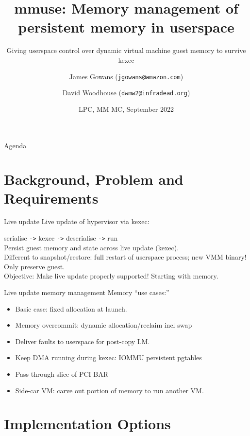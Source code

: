 \documentclass{beamer}
\title{mmuse: Memory management of persistent memory in userspace}
\subtitle{Giving userspace control over dynamic virtual machine guest memory to survive kexec}
\author[James Gowans \& David Woodhouse (EC2) ]{James Gowans (\texttt{jgowans@amazon.com}) \\ \and David Woodhouse (\texttt{dwmw2@infradead.org})}
\institute{Amazon / AWS / EC2}
\date{LPC, MM MC, September 2022}
\begin{document}
\begin{frame}
\titlepage
\end{frame}


\begin{frame}{Agenda}
  \tableofcontents[hideallsubsections]
\end{frame}


\section{Background, Problem and Requirements}

\begin{frame}{Live update}
  Live update of hypervisor via kexec:

  serialise \texttt{->} kexec \texttt{->} deserialise \texttt{->} run\\
    
  Persist guest memory and state across live update (kexec).\\

  Different to snapshot/restore: full restart of userspace process; new VMM binary! Only preserve guest.\\

  Objective: Make live update properly supported! Starting with memory.
\end{frame}

\begin{frame}{Live update memory management}
  Memory ``use cases:''
  \begin{itemize}
    \item Basic case: fixed allocation at launch.
    \item Memory overcommit: dynamic allocation/reclaim incl swap
    \item Deliver faults to userspace for post-copy LM.
    \item Keep DMA running during kexec: IOMMU persistent pgtables
    \item Pass through slice of PCI BAR
    \item Side-car VM: carve out portion of memory to run another VM.
  \end{itemize}
\end{frame}

\section{Implementation Options}
\end{document}
